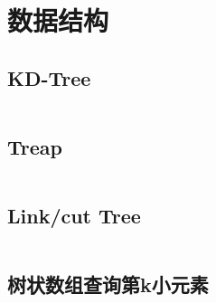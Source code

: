 \chapter{数据结构}
\section{KD-Tree}
\inputminted{cpp}{\source/data-structure/kd-tree.cpp}
\section{Treap}
\inputminted{cpp}{\source/data-structure/treap.cpp}
\section{Link/cut Tree}
\inputminted{cpp}{\source/data-structure/link-cut-tree.cpp}
\section{树状数组查询第k小元素}
\inputminted{cpp}{\source/data-structure/fenwick-tree.cpp}
